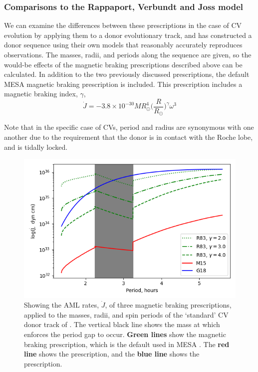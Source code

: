 \subsubsection{Comparisons to the Rappaport, Verbundt and Joss model}

We can examine the differences between these prescriptions in the case of CV evolution by applying them to a donor evolutionary track, and \citet{knigge11} has constructed a donor sequence using their own models that reasonably accurately reproduces observations. The masses, radii, and periods along the sequence are given, so the would-be effects of the magnetic braking prescriptions described above can be calculated. In addition to the two previously discussed prescriptions, the default MESA \citep{Paxton_2015} magnetic braking prescription \citep{rappaport1983} is included. This prescription includes a magnetic braking index, $\gamma$,
\begin{equation}
    \dot J = -3.8\times10^{-30} M R_\odot^4 \bigg( \frac{R}{R_\odot} \bigg)^\gamma \omega^3
\end{equation}

Note that in the specific case of CVs, period and radius are synonymous with one another due to the requirement that the donor is in contact with the Roche lobe, and is tidally locked. 

\begin{figure}
    \centering
    \includegraphics[width=\textwidth, trim={1cm 0 0 0}]{figures/introduction/rappaport_garraffo_matt_magbraking_period.png}
    \caption{Showing the AML rates, $\dot J$, of three magnetic braking prescriptions, applied to the masses, radii, and spin periods of the `standard' CV donor track of \citet{knigge11}. The vertical black line shows the mass at which \citet{knigge11} enforces the period gap to occur. {\bf Green lines} show the \citet{rappaport1983} magnetic braking prescription, which is the default used in MESA \citep{Paxton_2015}. The {\bf red line} shows the \citet{matt2015} prescription, and the {\bf blue line} shows the \citet{garraffo2018a} prescription.}
    \label{fig:introduction:rappaport garraffo matt magnetic braking}
\end{figure}

